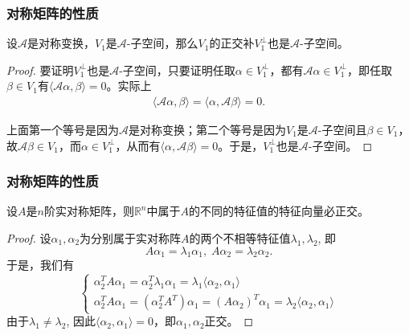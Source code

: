 \begin{frame}
\frametitle{对称矩阵的性质}

\begin{lem}
设$\mathscr{A}$是对称变换，$V_1$是$\mathscr{A}$-子空间，那么$V_1$的正交补$V_1^{\perp}$也是$\mathscr{A}$-子空间。
\end{lem}

\vspace{1em}
\pause

\begin{proof}
要证明$V_1^{\perp}$也是$\mathscr{A}$-子空间，只要证明任取$\alpha\in V_1^{\perp}$，都有$\mathscr{A}\alpha\in V_1^{\perp}$，即任取$\beta\in V_1$有$\langle \mathscr{A}\alpha, \beta \rangle = 0$。实际上
\begin{align*}
    \langle \mathscr{A}\alpha, \beta \rangle = \langle \alpha, \mathscr{A}\beta \rangle = 0.
\end{align*}

\pause

上面第一个等号是因为$\mathscr{A}$是对称变换；第二个等号是因为$V_1$是$\mathscr{A}$-子空间且$\beta\in V_1$，故$\mathscr{A}\beta \in V_1$，而$\alpha\in V_1^{\perp}$，从而有$\langle \alpha, \mathscr{A}\beta \rangle = 0$。于是，$V_1^{\perp}$也是$\mathscr{A}$-子空间。
\end{proof}

\end{frame}


\begin{frame}
\frametitle{对称矩阵的性质}

\begin{lem}
设$A$是$n$阶实对称矩阵，则$\mathbb{R}^n$中属于$A$的不同的特征值的特征向量必正交。
\end{lem}

\vspace{0.5em}
\pause

\begin{proof}
设$\alpha_1, \alpha_2$为分别属于实对称阵$A$的两个不相等特征值$\lambda_1, \lambda_2$, 即
$$A\alpha_1 = \lambda_1\alpha_1, \; A\alpha_2 = \lambda_2\alpha_2.$$
于是，我们有
$$\begin{cases}
\alpha_2^T A\alpha_1 = \alpha_2^T\lambda_1\alpha_1 = \lambda_1 \langle \alpha_2, \alpha_1 \rangle \\
\alpha_2^T A\alpha_1 = (\alpha_2^T A^T)\alpha_1 = (A\alpha_2)^T\alpha_1 = \lambda_2 \langle \alpha_2, \alpha_1 \rangle
\end{cases}$$
由于$\lambda_1 \neq \lambda_2$, 因此$\langle \alpha_2, \alpha_1 \rangle = 0$，即$\alpha_1, \alpha_2$正交。
\end{proof}

\end{frame}

